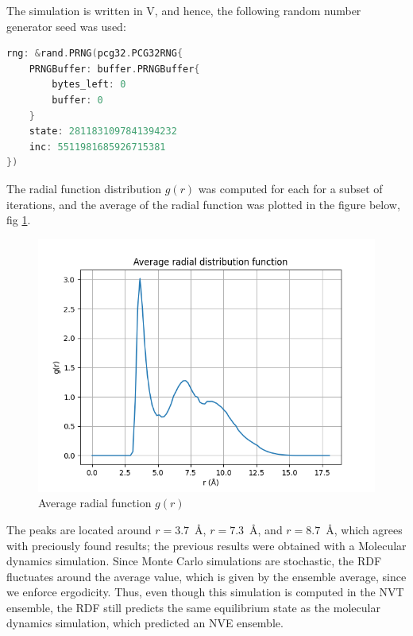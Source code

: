 \documentclass[a4paper]{article}
\newcommand{\newparagraph}{\vspace{.5cm}\noindent}
\begin{document}
\newparagraph
The simulation is written in V, and hence, the following random number generator seed was used:
\begin{lstlisting}[language = C, caption = {Random number generator seed}]
    rng: &rand.PRNG(pcg32.PCG32RNG{
    PRNGBuffer: buffer.PRNGBuffer{
        bytes_left: 0
        buffer: 0
    }
    state: 2811831097841394232
    inc: 5511981685926715381
})
\end{lstlisting}

\newparagraph
The radial function distribution $g(r)$ was computed for each for a subset of iterations, and the average of the radial function was plotted in the figure below, fig \ref{fig: radial function}.
\begin{figure}[H]
    \centering
    \includegraphics[scale = 0.5]{average_radial.png}
    \caption{Average radial function $g(r)$}
    \label{fig: radial function}
\end{figure}\noindent
The peaks are located around $r = 3.7$~Å, $r=7.3$~Å, and $r = 8.7$~Å, which agrees with preciously found results; the previous results were obtained with a Molecular dynamics simulation.
Since Monte Carlo simulations are stochastic, the RDF fluctuates around the average value, which is given by the ensemble average, since we enforce ergodicity. 
Thus, even though this simulation is computed in the NVT ensemble, the RDF still predicts the same equilibrium state as the molecular dynamics simulation, which predicted an NVE ensemble.
\end{document}
